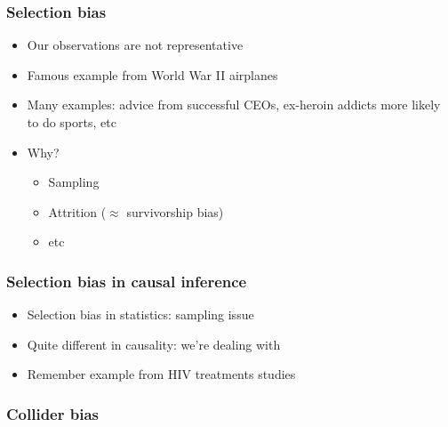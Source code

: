\documentclass[aspectratio=43]{beamer}
\begin{document}
\begin{frame}
\frametitle{Selection bias}\label{selectbias}
\centering

\begin{itemize}
  \item Our observations are not representative
  \item Famous example from World War II airplanes
  \item Many examples: advice from successful CEOs, ex-heroin addicts more likely to do sports, etc
  \item Why?
  \begin{itemize}
    \item Sampling
    \item Attrition ($\approx$ survivorship bias)
    \item etc
  \end{itemize}
\end{itemize}

\end{frame}


\begin{frame}
\frametitle{Selection bias in causal inference}
\centering

\begin{itemize}
  \item Selection bias in statistics: sampling issue
  \item Quite different in causality: we're dealing with 
  \item Remember example from HIV treatments studies
\end{itemize}

\end{frame}

\begin{frame}
\frametitle{Collider bias}\label{collider}
\centering


\end{frame}


%
%
\end{document}
